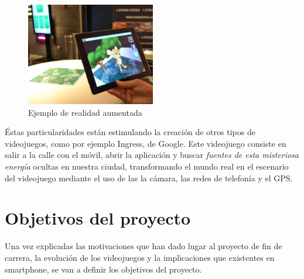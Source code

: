 \begin{figure}[h]
	\centerfloat	 
        \includegraphics[height=45mm]{imagenes/capitulo1/realidadaumentada.jpg}
	\caption{Ejemplo de realidad aumentada}
\end{figure}

Éstas particularidades están estimulando la creación de otros tipos de videojuegos, como por ejemplo Ingress, de Google. Este videojuego consiste en salir a la calle con el móvil, abrir la aplicación y buscar  \emph{fuentes de esta misteriosa energía} ocultas en nuestra ciudad, transformando el mundo real en el escenario del videojuego mediante el uso de las la cámara, las redes de telefonía y el GPS. 
%

\section{Objetivos del proyecto}

Una vez explicadas las motivaciones que han dado lugar al proyecto de fin de carrera, la evolución de los videojuegos y la implicaciones que existentes en smartphone, se van a definir los objetivos del proyecto.

